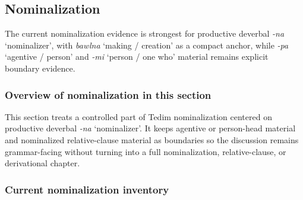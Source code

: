 \documentclass[
  11pt,
  a4paper,
]{article}
\newcommand{\tdim}[1]{\textit{#1}}
\newcommand{\glossquote}[1]{`#1'}
\begin{document}
\subsection{Nominalization}\label{nominalization}

The current nominalization evidence is strongest for productive deverbal
\tdim{-na} \glossquote{nominalizer}, with \tdim{bawlna}
\glossquote{making / creation} as a compact anchor, while \tdim{-pa}
\glossquote{agentive / person} and \tdim{-mi}
\glossquote{person / one who} material remains explicit boundary
evidence.

\subsubsection{Overview of nominalization in this
section}\label{overview-of-nominalization-in-this-section}

This section treats a controlled part of Tedim nominalization centered
on productive deverbal \tdim{-na} \glossquote{nominalizer}. It keeps
agentive or person-head material and nominalized relative-clause
material as boundaries so the discussion remains grammar-facing without
turning into a full nominalization, relative-clause, or derivational
chapter.

\subsubsection{Current nominalization
inventory}\label{current-nominalization-inventory}
\end{document}

